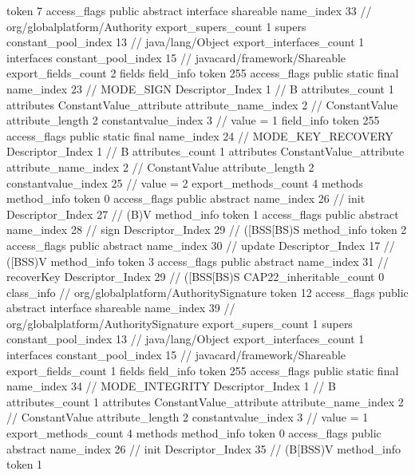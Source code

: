 {{{			token	7
			access_flags	public abstract interface shareable
			name_index	33		// org/globalplatform/Authority
			export_supers_count	1
			supers {
				constant_pool_index	13		// java/lang/Object
			}
			export_interfaces_count	1
			interfaces {
				constant_pool_index	15		// javacard/framework/Shareable
			}
			export_fields_count	2
			fields {
			field_info {
				token	255
				access_flags	public static final
				name_index	23		// MODE_SIGN
				Descriptor_Index	1		// B
				attributes_count	1
				attributes {
				ConstantValue_attribute {
					attribute_name_index	2		// ConstantValue
					attribute_length	2
					constantvalue_index	3		// value = 1
				}
				}
			}
			field_info {
				token	255
				access_flags	public static final
				name_index	24		// MODE_KEY_RECOVERY
				Descriptor_Index	1		// B
				attributes_count	1
				attributes {
				ConstantValue_attribute {
					attribute_name_index	2		// ConstantValue
					attribute_length	2
					constantvalue_index	25		// value = 2
				}
				}
			}
			}
			export_methods_count	4
			methods {
				method_info {
					token	0
					access_flags	public abstract
					name_index	26		// init
					Descriptor_Index	27		// (B)V
				}
				method_info {
					token	1
					access_flags	public abstract
					name_index	28		// sign
					Descriptor_Index	29		// ([BSS[BS)S
				}
				method_info {
					token	2
					access_flags	public abstract
					name_index	30		// update
					Descriptor_Index	17		// ([BSS)V
				}
				method_info {
					token	3
					access_flags	public abstract
					name_index	31		// recoverKey
					Descriptor_Index	29		// ([BSS[BS)S
				}
			}
			CAP22_inheritable_count	0
		}
		class_info {		// org/globalplatform/AuthoritySignature
			token	12
			access_flags	public abstract interface shareable
			name_index	39		// org/globalplatform/AuthoritySignature
			export_supers_count	1
			supers {
				constant_pool_index	13		// java/lang/Object
			}
			export_interfaces_count	1
			interfaces {
				constant_pool_index	15		// javacard/framework/Shareable
			}
			export_fields_count	1
			fields {
			field_info {
				token	255
				access_flags	public static final
				name_index	34		// MODE_INTEGRITY
				Descriptor_Index	1		// B
				attributes_count	1
				attributes {
				ConstantValue_attribute {
					attribute_name_index	2		// ConstantValue
					attribute_length	2
					constantvalue_index	3		// value = 1
				}
				}
			}
			}
			export_methods_count	4
			methods {
				method_info {
					token	0
					access_flags	public abstract
					name_index	26		// init
					Descriptor_Index	35		// (B[BSS)V
				}
				method_info {
					token	1
}}}}}
